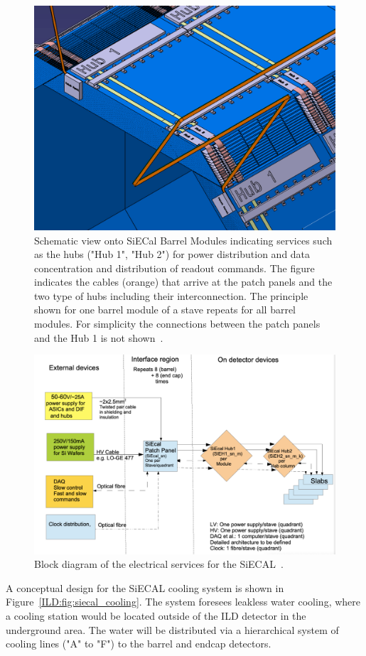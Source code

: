 \begin{figure}[h!]
    \centering
        \includegraphics[width=0.6\hsize]{Integration/fig/SiECAL_Services_v3.pdf}
    \caption{Schematic view onto SiECal Barrel Modules indicating services such as the hubs ("Hub 1", "Hub 2") for power distribution and data concentration and distribution of readout commands. The figure indicates the cables (orange) that arrive at the patch panels and the two type of hubs including their interconnection. The principle shown for one barrel module of a stave repeats for all barrel modules. For simplicity the connections between the patch panels and the Hub 1 is not shown~\cite{ild:bib:SiECAL_ICD}.}
    \label{ILD:fig:siecal_services}
\end{figure}

\begin{figure}[h!]
    \centering
        \includegraphics[width=0.8\hsize]{Integration/fig/SiECAL_Block_Diagram_v2.pdf}
    \caption{Block diagram of the electrical services for the SiECAL~\cite{ild:bib:SiECAL_ICD}.}
    \label{ILD:fig:siecal_block_diagram}
\end{figure}

A conceptual design for the SiECAL cooling system is shown in Figure~\ref{ILD:fig:siecal_cooling}. The system foresees leakless water cooling, where a cooling station would be located outside of the ILD detector in the underground area. The water will be distributed via a hierarchical system of cooling lines ("A" to "F") to the barrel and endcap detectors.

